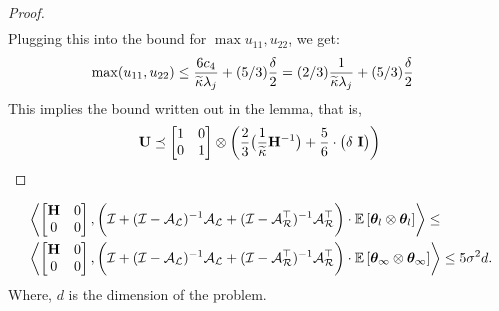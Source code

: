 \begin{proof}
\begin{align*}
\end{align*}
Plugging this into the bound for $\max{u_{11},u_{22}}$, we get:
\begin{align*}
\max(u_{11},u_{22}) &\leq \frac{6c_4}{\widetilde{\kappa}\lambda_j} + (5/3)\frac{\delta}{2}=(2/3)\frac{1}{\widetilde{\kappa}\lambda_j}+(5/3)\frac{\delta}{2}
\end{align*}
This implies the bound written out in the lemma, that is,
\begin{align*}
\U\preceq\begin{bmatrix}1&0\\0&1\end{bmatrix}\otimes\bigg(\frac{2}{3}\big(\frac{1}{\cnS}\Hinv\big)+\frac{5}{6}\cdot\big(\delta\ \eye\big)\bigg)
\end{align*}
\end{proof}

\begin{lemma}\label{lem:var-main-1}
\begin{align*}
&\left\langle \begin{bmatrix}\mathbf{H}&0\\0&0\end{bmatrix}, \bigg(\mathcal{I}+(\mathcal{I}-\mathcal{A}_{\mathcal{L}})^{-1}\mathcal{A}_{\mathcal{L}}+(\mathcal{I}-\mathcal{A}_{\mathcal{R}}^{\top})^{-1}\mathcal{A}_{\mathcal{R}}^{\top}\bigg)\cdot\mathbb{E}\left[\boldsymbol{\theta}_{l}\otimes\boldsymbol{\theta}_{l}\right] \right\rangle\leq\nonumber\\&\left\langle \begin{bmatrix}\mathbf{H}&0\\0&0\end{bmatrix}, \bigg(\mathcal{I}+(\mathcal{I}-\mathcal{A}_{\mathcal{L}})^{-1}\mathcal{A}_{\mathcal{L}}+(\mathcal{I}-\mathcal{A}_{\mathcal{R}}^{\top})^{-1}\mathcal{A}_{\mathcal{R}}^{\top}\bigg)\cdot\mathbb{E}\left[\boldsymbol{\theta}_{\infty}\otimes\boldsymbol{\theta}_{\infty}\right] \right\rangle\leq 5  \sigma^2 d.
\end{align*}
Where, $d$ is the dimension of the problem.
\label{lem:leadingOrderVar}
\end{lemma}

